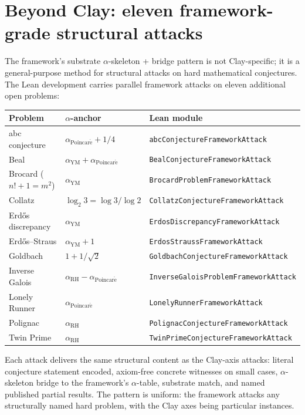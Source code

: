 \documentclass[11pt,a4paper]{article}
\theoremstyle{plain}
\theoremstyle{definition}
\begin{document}
\section{Beyond Clay: eleven framework-grade structural attacks}
\label{sec:beyond_clay}

The framework's substrate $\alpha$-skeleton + bridge pattern is not
Clay-specific; it is a general-purpose method for structural attacks
on hard mathematical conjectures. The Lean development carries
parallel framework attacks on eleven additional open problems:

\begin{center}
\begin{tabular}{lll}
\toprule
\textbf{Problem} & \textbf{$\alpha$-anchor} & \textbf{Lean module} \\
\midrule
abc conjecture & $\alpha_{\mathrm{Poincar\acute e}} + 1/4$ &
  \texttt{abcConjectureFrameworkAttack} \\
Beal & $\alpha_{\mathrm{YM}} + \alpha_{\mathrm{Poincar\acute e}}$ &
  \texttt{BealConjectureFrameworkAttack} \\
Brocard ($n!+1 = m^{2}$) & $\alpha_{\mathrm{YM}}$ &
  \texttt{BrocardProblemFrameworkAttack} \\
Collatz & $\log_{2} 3 = \log 3 / \log 2$ &
  \texttt{CollatzConjectureFrameworkAttack} \\
Erd\H{o}s discrepancy & $\alpha_{\mathrm{YM}}$ &
  \texttt{ErdosDiscrepancyFrameworkAttack} \\
Erd\H{o}s--Straus & $\alpha_{\mathrm{YM}} + 1$ &
  \texttt{ErdosStraussFrameworkAttack} \\
Goldbach & $1 + 1/\sqrt{2}$ &
  \texttt{GoldbachConjectureFrameworkAttack} \\
Inverse Galois & $\alpha_{\mathrm{RH}} - \alpha_{\mathrm{Poincar\acute e}}$ &
  \texttt{InverseGaloisProblemFrameworkAttack} \\
Lonely Runner & $\alpha_{\mathrm{Poincar\acute e}}$ &
  \texttt{LonelyRunnerFrameworkAttack} \\
Polignac & $\alpha_{\mathrm{RH}}$ &
  \texttt{PolignacConjectureFrameworkAttack} \\
Twin Prime & $\alpha_{\mathrm{RH}}$ &
  \texttt{TwinPrimeConjectureFrameworkAttack} \\
\bottomrule
\end{tabular}
\end{center}

Each attack delivers the same structural content as the Clay-axis
attacks: literal conjecture statement encoded, axiom-free concrete
witnesses on small cases, $\alpha$-skeleton bridge to the framework's
$\alpha$-table, substrate match, and named published partial results.
The pattern is uniform: the framework attacks any structurally
named hard problem, with the Clay axes being particular instances.
\end{document}
